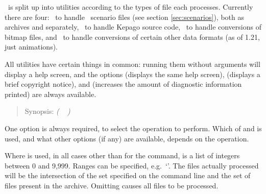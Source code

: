 
\newenvironment{extraopts}{\\[0.5\baselineskip]Additional options: \begin{nicelist}}{\end{nicelist}}



\package\ is split up into utilities according to the types of file each
processes.  Currently there are four: \archiver\ to handle \reallive\ scenario
files (see section \ref{sec:scenarios}), both as archives and separately,
\compiler\ to handle Kepago source code, \converter\ to handle conversions of
bitmap files, and \dataxml\ to handle conversions of certain other data formats
(as of 1.21, just  animations).

All utilities have certain things in common: running them without arguments will
display a help screen, and the options  (displays the same help
screen),  (displays a brief copyright notice), and
 (increases the amount of diagnostic information printed) are
always available.


  \begin{quote}
    Synopsis:  
    \textit{(} \textbar\ 
              \textit{)}
  \end{quote}

  \noindent One option is always required, to select the operation to perform.
  Which of  and  is used, and what other options
  (if any) are available, depends on the operation.

  Where  is used, in all cases other than for the 
  command,  is a list of integers between 0 and 9,999.  Ranges
  can be specified, e.g.\ `'.  The files actually processed
  will be the intersection of the set specified on the command line and the set
  of files present in the archive.  Omitting  causes all files
  to be processed.


